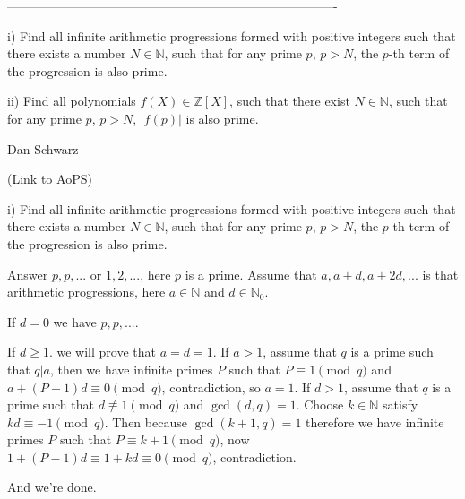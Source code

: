 -------------------------------------------------------------------------------

\begin{problem}
	i) Find all infinite arithmetic progressions formed with positive integers such that there exists a number $N \in \mathbb{N}$, such that for any prime $p$, $p > N$, 
the $p$-th term of the progression is also prime.

ii) Find all polynomials $f(X) \in \mathbb{Z}[X]$, such that there exist $N \in \mathbb{N}$, such that for any prime $p$, $p > N$, $| f(p) |$ is also prime.

\begin{italicized}Dan Schwarz\end{italicized}
	\flushright \href{https://artofproblemsolving.com/community/c6h150161}{(Link to AoPS)}
\end{problem}



\begin{solution}
	\begin{tcolorbox}i) Find all infinite arithmetic progressions formed with positive integers such that there exists a number $N \in \mathbb{N}$, such that for any prime $p$, $p > N$, 
the $p$-th term of the progression is also prime.
\end{tcolorbox}
Answer $p,p,...$ or $1,2,...$, here $p$ is a prime.
Assume that $a,a+d,a+2d,...$ is that arithmetic progressions, here $a\in\mathbb{N}$ and $d\in\mathbb{N}_{0}$.

If $d=0$ we have $p,p,...$.

If $d\geq 1$. we will prove that $a=d=1$. If $a>1$, assume that $q$ is a prime such that $q|a$, then we have infinite primes $P$ such that $P\equiv 1\pmod{q}$ and $a+(P-1)d\equiv 0\pmod{q}$, contradiction, so $a=1$. If $d>1$, assume that $q$ is a prime such that $d\not\equiv 1\pmod{q}$ and $\gcd (d,q)=1$. Choose $k\in\mathbb{N}$ satisfy $kd\equiv-1\pmod{q}$. Then because $\gcd (k+1,q)=1$ therefore we have infinite primes $P$ such that $P\equiv k+1\pmod{q}$, now $1+(P-1)d\equiv 1+kd\equiv 0\pmod{q}$, contradiction.

And we're done.
\end{solution}



